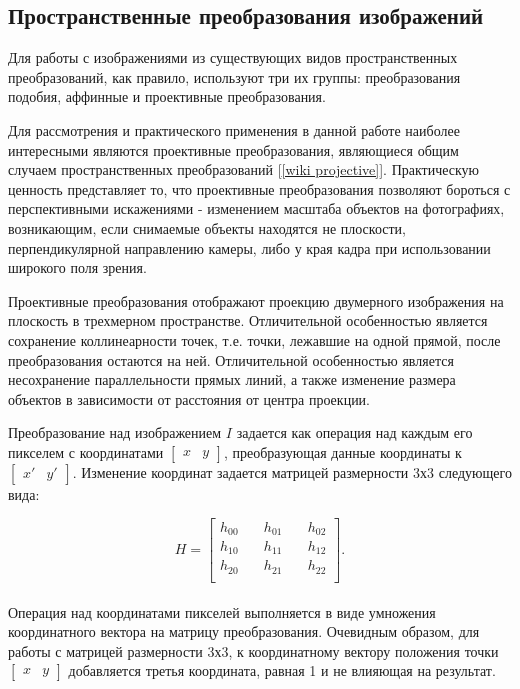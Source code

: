 {{%
}
\subsection{Пространственные преобразования изображений}{	
	Для работы с изображениями из существующих видов пространственных преобразований, как правило, используют три их группы: преобразования подобия, аффинные и проективные преобразования.
	
	Для рассмотрения и практического применения в данной работе наиболее интересными являются проективные преобразования, являющиеся общим случаем пространственных преобразований [\ref{wiki projective}]. Практическую ценность представляет то, что проективные преобразования позволяют бороться с перспективными искажениями - изменением масштаба объектов на фотографиях, возникающим, если снимаемые объекты находятся не плоскости, перпендикулярной направлению камеры, либо у края кадра при использовании широкого поля зрения.	
	
	Проективные преобразования отображают проекцию двумерного изображения на плоскость в трехмерном пространстве. Отличительной особенностью является сохранение коллинеарности точек, т.е. точки, лежавшие на одной прямой, после преобразования остаются на ней. Отличительной особенностью является несохранение параллельности прямых линий, а также изменение размера объектов в зависимости от расстояния от центра проекции.
	
	Преобразование над изображением $I$ задается как операция над каждым его пикселем с координатами $\begin{bmatrix}x&y\end{bmatrix}$, преобразующая данные координаты к $\begin{bmatrix}x'&y'\end{bmatrix}$. Изменение координат задается матрицей размерности 3х3 следующего вида:
	
	$$
	H = 
	\begin{bmatrix}
	h_{00} &\quad h_{01} &\quad h_{02} \\
	h_{10} &\quad h_{11} &\quad h_{12} \\
	h_{20} &\quad h_{21} &\quad h_{22} \\
	\end{bmatrix}.
	$$	
	\\
	
	Операция над координатами пикселей выполняется в виде умножения координатного вектора на матрицу преобразования. Очевидным образом, для работы с матрицей размерности 3х3, к координатному вектору положения точки $\begin{bmatrix}x&y\end{bmatrix}$ добавляется третья координата, равная 1 и не влияющая на результат.
	
}}
